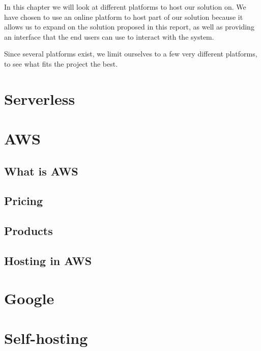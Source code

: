 In this chapter we will look at different platforms to host our solution on. We have chosen to use an online platform to host part of our solution because it allows us to expand on the solution proposed in this report, as well as providing an interface that the end users can use to interact with the system.

Since several platforms exist, we limit ourselves to a few very different platforms, to see what fits the project the best.


\section{Serverless}

\section{AWS}

\subsection{What is AWS}
\subsection{Pricing}
\subsection{Products}
\subsection{Hosting in AWS}


\section{Google}

\section{Self-hosting}
